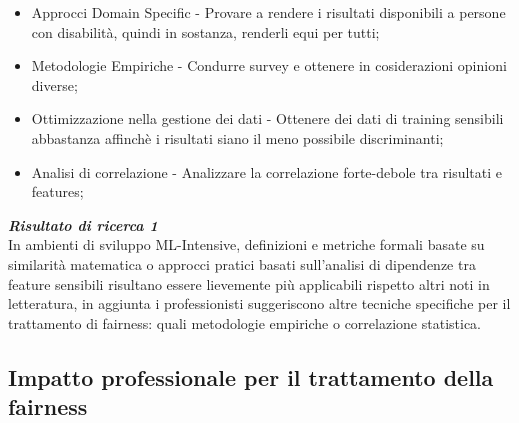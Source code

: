 	\begin{itemize}
	    \item Approcci Domain Specific - Provare a rendere i risultati disponibili a persone con disabilità, quindi in sostanza, renderli equi per tutti; 
	    \item Metodologie Empiriche - Condurre survey e ottenere in cosiderazioni opinioni diverse;
	    \item Ottimizzazione nella gestione dei dati - Ottenere dei dati di training sensibili abbastanza affinchè i risultati siano il meno possibile discriminanti;
	    \item Analisi di correlazione - Analizzare la correlazione forte-debole tra risultati e features;
	\end{itemize}
    
	
	
	\begin{center}
	
        \begin{tcolorbox}[width=\textwidth, colframe=black, colback=Gray]
    			\begin{minipage}{\textwidth}
    				\textit{\faKey  \textbf{ Risultato di ricerca 1}}\\
    				In ambienti di sviluppo ML-Intensive, definizioni e metriche formali basate su similarità matematica o approcci pratici basati sull'analisi di dipendenze tra feature sensibili risultano essere lievemente più applicabili rispetto altri noti in letteratura, in aggiunta i professionisti suggeriscono altre tecniche specifiche per il trattamento di fairness: quali metodologie empiriche o correlazione statistica.
    			
    			\end{minipage}
		\end{tcolorbox}
	\end{center}
	
	
	
    \subsection{Impatto professionale per il trattamento della fairness}
	\begin{center}
		\hspace*{-5mm}%
	\end{center}
	
